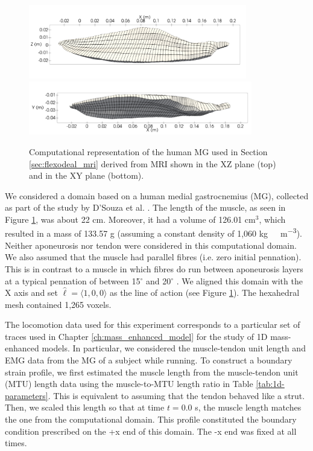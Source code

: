 \documentclass{sfuthesis}
\numberwithin{equation}{section}
\numberwithin{figure}{chapter}
\numberwithin{table}{chapter}
\theoremstyle{definition}
\begin{document}
\begin{figure}
    \centering
    \includegraphics[width=0.85\textwidth]{mri_mesh_XZ.png}\\
    \hspace*{-1.4em}\includegraphics[width=0.87\textwidth]{mri_mesh_XY.png}
    \caption{Computational representation of the human MG used in Section \ref{sec:flexodeal_mri} derived from MRI shown in the XZ plane (top) and in the XY plane (bottom).
    \label{fig:mri_mesh}}
\end{figure}

We considered a domain based on a human medial gastrocnemius (MG), collected as part of the study by D'Souza et al. \cite{DSouza2019}. 
The length of the muscle, as seen in Figure \ref{fig:mri_mesh}, was about 22 cm. Moreover, it had a volume of 126.01 cm$^3$, which resulted in a mass of 133.57 g (assuming a constant density of 1,060 \unit{kg \ m^{-3}}). Neither aponeurosis nor tendon were considered in this computational domain. We also assumed that the muscle had parallel fibres (i.e. zero initial pennation). This is in contrast to a muscle in which fibres do run between aponeurosis layers at a typical pennation of between 15$^\circ$ and 20$^\circ$ \cite{Narici1996}. We aligned this domain with the X axis and set $\widehat{\bm{\ell}} = \langle 1 ,0,0 \rangle$ as the line of action (see Figure \ref{fig:mri_mesh}). The hexahedral mesh contained 1,265 voxels.

The locomotion data used for this experiment corresponds to a particular set of traces used in Chapter \ref{ch:mass_enhanced_model} for the study of 1D mass-enhanced models. In particular, we considered the muscle-tendon unit length and EMG data from the MG of a subject while running. To construct a boundary strain profile, we first estimated the muscle length from the muscle-tendon unit (MTU) length data using the muscle-to-MTU length ratio in Table \ref{tab:1d-parameters}. This is equivalent to assuming that the tendon behaved like a strut. Then, we scaled this length so that at time $t = 0.0$ s, the muscle length matches the one from the computational domain. This profile constituted the boundary condition prescribed on the +x end of this domain. The -x end was fixed at all times.
\end{document}
